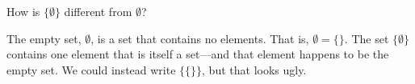 \documentclass[nooutcomes]{ximera}
\begin{document}
\begin{problem}
How is $\{\emptyset\}$ different from $\emptyset$?  
\begin{freeResponse}
\begin{hint}
The empty set, $\emptyset$, is a set that contains no elements.  That is, $\emptyset = \{\}$.  The set $\{\emptyset\}$ contains one element that is itself a set---and that element happens to be the empty set.  We could instead write $\{\{\}\}$, but that looks ugly.
\end{hint}
\end{freeResponse}
\end{problem}

%
%
%
%
\end{document}
